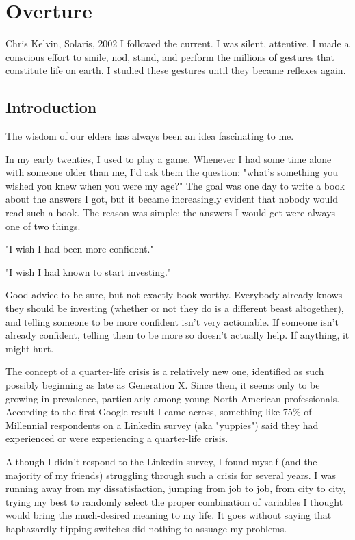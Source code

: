 \documentclass[./the-millions-of-gestures.tex]{subfiles}
\begin{document}
\chapter*{Overture}


\begin{aquote}{Chris Kelvin, Solaris, 2002}
  I followed the current. I was silent, attentive. I made a conscious effort to
  smile, nod, stand, and perform the millions of gestures that constitute life
  on earth. I studied these gestures until they became reflexes again.
\end{aquote}

\section*{Introduction}

The wisdom of our elders has always been an idea fascinating to me.

In my early twenties, I used to play a game. Whenever I had some time alone with
someone older than me, I'd ask them the question: "what's something you wished
you knew when you were my age?" The goal was one day to write a book about the
answers I got, but it became increasingly evident that nobody would read such a
book. The reason was simple: the answers I would get were always one of two
things.

"I wish I had been more confident."

"I wish I had known to start investing."

Good advice to be sure, but not exactly book-worthy. Everybody already knows
they should be investing (whether or not they do is a different beast
altogether), and telling someone to be more confident isn't very actionable. If
someone isn't already confident, telling them to be more so doesn't actually
help. If anything, it might hurt.

The concept of a quarter-life crisis is a relatively new one, identified as such
possibly beginning as late as Generation X. Since then, it seems only to be
growing in prevalence, particularly among young North American professionals.
According to the first Google result I came across, something like 75\% of
Millennial respondents on a Linkedin survey (aka "yuppies") said they had
experienced or were experiencing a quarter-life crisis.

Although I didn't respond to the Linkedin survey, I found myself (and the
majority of my friends) struggling through such a crisis for several years. I
was running away from my dissatisfaction, jumping from job to job, from city to
city, trying my best to randomly select the proper combination of variables I
thought would bring the much-desired meaning to my life. It goes without saying
that haphazardly flipping switches did nothing to assuage my problems.
\end{document}
